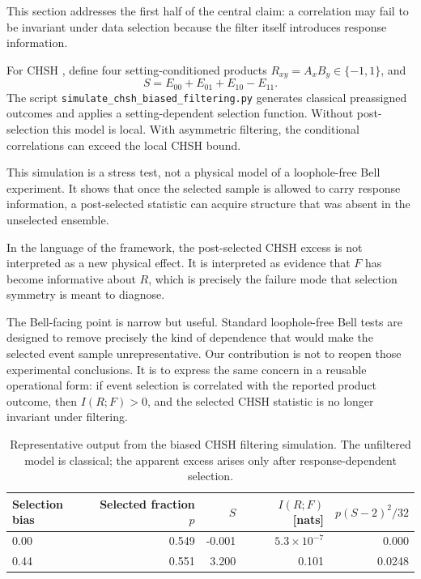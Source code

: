 \documentclass[11pt]{article}
\begin{document}
This section addresses the first half of the central claim: a correlation may fail to be invariant under data selection because the filter itself introduces response information.

For CHSH \cite{CHSH1969}, define four setting-conditioned products \(R_{xy}=A_xB_y\in\{-1,1\}\), and
\begin{equation}
S = E_{00}+E_{01}+E_{10}-E_{11}.
\end{equation}
The script \texttt{simulate\_chsh\_biased\_filtering.py} generates classical preassigned outcomes and applies a setting-dependent selection function. Without post-selection this model is local. With asymmetric filtering, the conditional correlations can exceed the local CHSH bound.

This simulation is a stress test, not a physical model of a loophole-free Bell experiment. It shows that once the selected sample is allowed to carry response information, a post-selected statistic can acquire structure that was absent in the unselected ensemble.

In the language of the framework, the post-selected CHSH excess is not interpreted as a new physical effect. It is interpreted as evidence that \(F\) has become informative about \(R\), which is precisely the failure mode that selection symmetry is meant to diagnose.

The Bell-facing point is narrow but useful. Standard loophole-free Bell tests are designed to remove precisely the kind of dependence that would make the selected event sample unrepresentative. Our contribution is not to reopen those experimental conclusions. It is to express the same concern in a reusable operational form: if event selection is correlated with the reported product outcome, then \(I(R;F)>0\), and the selected CHSH statistic is no longer invariant under filtering.

\begin{table}[ht]
\centering
\caption{Representative output from the biased CHSH filtering simulation. The unfiltered model is classical; the apparent excess arises only after response-dependent selection.}
\label{tab:chsh-results}
\begin{tabular}{lrrrr}
\toprule
Selection bias & Selected fraction \(p\) & \(S\) & \(I(R;F)\) [nats] & \(p(S-2)^2/32\) \\
\midrule
0.00 & 0.549 & -0.001 & \(5.3\times 10^{-7}\) & 0.000 \\
0.44 & 0.551 & 3.200 & 0.101 & 0.0248 \\
\bottomrule
\end{tabular}
\end{table}
\end{document}
